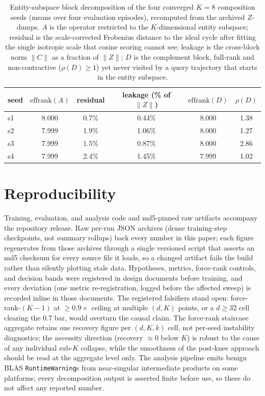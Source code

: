 \begin{table}[!htb]
\centering
\small
\begin{tabular}{lccccc}
\toprule
seed & $\mathrm{effrank}(A)$ & residual & leakage (\% of $\|Z\|$) & $\mathrm{effrank}(D)$ & $\rho(D)$ \\
\midrule
s1 & 8.000 & 0.7\% & 0.44\% & 8.000 & 1.38 \\
s2 & 7.999 & 1.9\% & 1.06\% & 8.000 & 1.27 \\
s3 & 7.999 & 1.5\% & 0.87\% & 8.000 & 2.86 \\
s4 & 7.999 & 2.4\% & 1.45\% & 7.999 & 1.02 \\
\bottomrule
\end{tabular}
\caption{Entity-subspace block decomposition of the four converged
$K{=}8$ composition seeds (means over four evaluation episodes),
recomputed from the archived $Z$-dumps. $A$ is the operator restricted
to the $K$-dimensional entity subspace; residual is the scale-corrected
Frobenius distance to the ideal cycle after fitting the single isotropic
scale that cosine scoring cannot see; leakage is the cross-block norm
$\|C\|$ as a fraction of $\|Z\|$; $D$ is the complement block, full-rank
and non-contractive ($\rho(D) \geq 1$) yet never visited by a query
trajectory that starts in the entity subspace.}
\label{tab:subspace}
\end{table}

\section{Reproducibility}
\label{app:repro}

Training, evaluation, and analysis code and md5-pinned raw artifacts
accompany the repository release. Raw
per-run JSON archives (dense training-step checkpoints, not summary
rollups) back every number in this paper; each figure regenerates
from those archives through a single versioned script that asserts an
md5 checksum for every source file it loads, so a changed artifact fails
the build rather than silently plotting stale data. Hypotheses, metrics,
force-rank controls, and decision bands were registered in design
documents before training, and every deviation (one metric
re-registration, logged before the affected sweep) is recorded inline
in those documents. The registered falsifiers stand open:
force-rank-$(K{-}1)$ at $\geq 0.9\times$ ceiling at multiple $(d, K)$
points, or a $d \geq 32$ cell clearing the 0.7 bar, would overturn the
causal claim.
The force-rank staircase aggregate retains one recovery figure per
$(d, K, k)$ cell, not per-seed instability diagnostics; the necessity
direction (recovery $\approx 0$ below $K$) is robust to the cause of
any individual sub-$K$ collapse, while the smoothness of the post-knee
approach should be read at the aggregate level only.
The analysis pipeline emits benign BLAS \texttt{RuntimeWarning}s from
near-singular intermediate products on some platforms; every
decomposition output is asserted finite before use, so these do not
affect any reported number.

